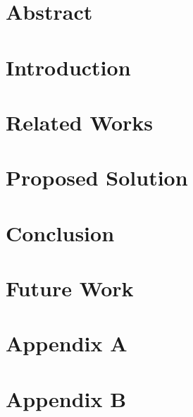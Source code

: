 \documentclass{article}
\begin{document}
\newpage
{}
\section*{Abstract}

\newpage
\tableofcontents
\newpage
\setcounter{page}{1}
\section{Introduction}

\section{Related Works}

\section{Proposed Solution}

\section{Conclusion}

\section{Future Work}

\clearpage
\printbibliography[heading=bibnumbered]
\clearpage
\section{Appendix A}


\section{Appendix B}

\end{document}
